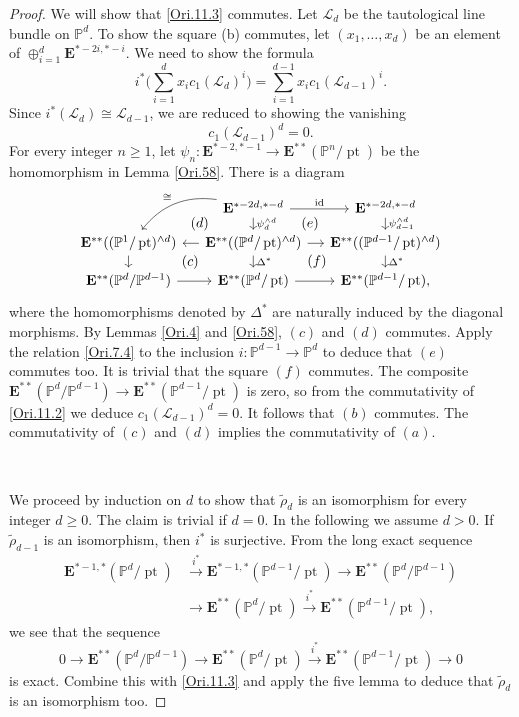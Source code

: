 \documentclass[11pt, a4paper]{amsart}
\theoremstyle{definition}
\numberwithin{equation}{subsection}
\renewcommand{\P}{\mathbb{P}}
\newcommand{\id}{\operatorname{id}}   			%
\newcommand{\pt}[1]{\mathrm{\pt}_{#1}}
\newcommand{\cL}{\mathcal{L}}
\def\pt{\operatorname{pt}}
\newcommand{\ringE}{\mathbf{E}}
\begin{document}
\begin{proof}
We will show that \eqref{Ori.11.3} commutes.
Let $\cL_d$ be the tautological line bundle on $\P^d$.
To show the square (b) commutes, let $(x_1,\ldots,x_d)$ be an element of $\oplus_{i=1}^d \ringE^{*-2i,*-i}$.
We need to show the formula
\[
i^*\big(\sum_{i=1}^d x_i c_1(\cL_d)^i \big)
=
\sum_{i=1}^{d-1} x_i c_1(\cL_{d-1})^i.
\]
Since $i^*(\cL_d)\cong \cL_{d-1}$, we are reduced to showing the vanishing
\begin{equation}
\label{Ori.11.4}
c_1(\cL_{d-1})^d=0.
\end{equation}
For every integer $n\geq 1$, let $\psi_n\colon \ringE^{*-2,*-1}\to \ringE^{**}(\P^n/\pt)$ be the homomorphism in Lemma \ref{Ori.58}.
There is a diagram
\begin{equation}
\label{Ori.11.2}
\begin{tikzcd}[column sep=small, row sep=small]
&
\ringE^{*-2d,*-d}\ar[r,"\id"]\ar[d,"\psi_d^{\wedge d}"]\ar[ld,"\cong"',bend right]\ar[ld,phantom,"(d)"]\ar[rd,phantom,"(e)"]&
\ringE^{*-2d,*-d}\ar[d,"\psi_{d-1}^{\wedge d}"] 
\\
\ringE^{**}((\P^1/\pt)^{\wedge d})\ar[r,leftarrow]\ar[d]\ar[rd,phantom,"(c)"]&
\ringE^{**}((\P^d/\pt)^{\wedge d})\ar[r]\ar[d,"\Delta^*"]\ar[rd,phantom,"(f)"]&
\ringE^{**}((\P^{d-1}/\pt)^{\wedge d})\ar[d,"\Delta^*"]
\\
\ringE^{**}(\P^d/\P^{d-1})\ar[r]&
\ringE^{**}(\P^d/\pt)\ar[r]&
\ringE^{**}(\P^{d-1}/\pt),
\end{tikzcd}
\end{equation}
where the homomorphisms denoted by $\Delta^*$ are naturally induced by the diagonal morphisms.
By Lemmas \ref{Ori.4} and \ref{Ori.58}, $(c)$ and $(d)$ commutes.
Apply the relation \eqref{Ori.7.4} to the inclusion $i\colon \P^{d-1}\to \P^d$ to deduce that $(e)$ commutes too.
It is trivial that the square $(f)$ commutes.
The composite $\ringE^{**}(\P^d/\P^{d-1})\to \ringE^{**}(\P^{d-1}/\pt)$ is zero, 
so from the commutativity of \eqref{Ori.11.2} we deduce $c_1(\cL_{d-1})^d=0$.
It follows that $(b)$ commutes.
The commutativity of $(c)$ and $(d)$ implies the commutativity of $(a)$.

\

We proceed by induction on $d$ to show that $\widetilde{\rho}_d$ is an isomorphism for every integer $d\geq 0$.
The claim is trivial if $d=0$.
In the following we assume $d>0$.
If $\widetilde{\rho}_{d-1}$ is an isomorphism, then $i^*$ is surjective.
From the long exact sequence
\begin{align*}
\ringE^{*-1,*}(\P^d/\pt)
&\xrightarrow{i^*}
\ringE^{*-1,*}(\P^{d-1}/\pt)
\to
\ringE^{**}(\P^d/\P^{d-1})
\\
&\to
\ringE^{**}(\P^d/\pt)
\xrightarrow{i^*}
\ringE^{**}(\P^{d-1}/\pt),
\end{align*}
we see that the sequence
\[
0
\to
\ringE^{**}(\P^d/\P^{d-1})
\to
\ringE^{**}(\P^d/\pt)
\xrightarrow{i^*}
\ringE^{**}(\P^{d-1}/\pt)
\to
0
\]
is exact.
Combine this with \eqref{Ori.11.3} and apply the five lemma to deduce that $\widetilde{\rho}_d$ is an isomorphism too.
\end{proof}
\end{document}
